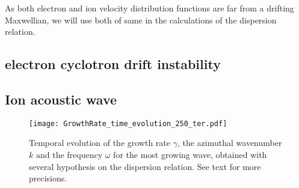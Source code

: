   \vspace{1em}
  As both electron and ion velocity distribution functions are far from a drifting Maxwellian, we will use both of same in the calculations of the dispersion relation.
  
  
  
  \subsection{electron cyclotron drift instability} \label{subsec-VDFpic}
  
  
  
  
  
  \subsection{Ion acoustic wave} \label{subsec-VDFIAW}
  
  
  
  \begin{figure}[hbtp]
    \centering
    \texttt{[image: GrowthRate\_time\_evolution\_250\_ter.pdf]}
    \caption{Temporal evolution of the growth rate $\gamma$, the azimuthal wavenumber $k$ and the frequency $\omega$ for the most growing wave, obtained with several hypothesis on the dispersion relation. See text for more precisions. }
    \label{fig-time_wave}
  \end{figure}
  